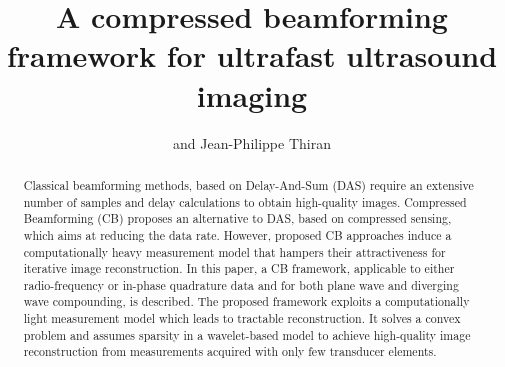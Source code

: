 \documentclass[conference]{IEEEtran}
\begin{document}
%
\title{A compressed beamforming framework for ultrafast ultrasound imaging}

\author{ and 
Jean-Philippe Thiran
}
\maketitle

\begin{abstract}
Classical beamforming methods, based on Delay-And-Sum (DAS) require an extensive number of samples and  delay calculations to obtain high-quality images. Compressed Beamforming (CB) proposes an alternative to DAS, based on compressed sensing, which aims at reducing the data rate. However, proposed CB approaches induce a computationally heavy measurement model that hampers their attractiveness for iterative image reconstruction. In this paper, a CB framework, applicable to either radio-frequency or in-phase quadrature data and for both plane wave and diverging wave compounding, is described. The proposed framework exploits a computationally light measurement model which leads to tractable reconstruction. It solves a convex problem and assumes sparsity in a wavelet-based model to achieve high-quality image reconstruction from measurements acquired with only few transducer elements. 
\end{abstract}
\end{document}
